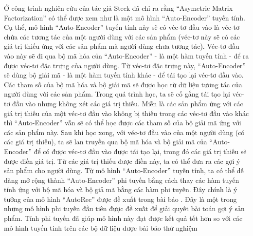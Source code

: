 Ở công trình nghiên cứu \cite{AMF} của tác giả Steck đã chỉ ra rằng “Asymetric Matrix Factorization” có thể được xem như là một mô hình “Auto-Encoder” tuyến tính. 
Cụ thể, mô hình ``Auto-Encoder'' tuyến tính này sẽ có véc-tơ đầu vào là véc-tơ chứa các tương tác của một người dùng với các sản phẩm (véc-tơ này sẽ có các giá trị thiếu ứng với các sản phẩm mà người dùng chưa tương tác). 
Véc-tơ đầu vào này sẽ đi qua bộ mã hóa của ``Auto-Encoder'' - là một hàm tuyến tính - để ra được véc-tơ đặc trưng của người dùng. 
Từ véc-tơ đặc trưng này, ``Auto-Encoder'' sẽ dùng bộ giải mã - là một hàm tuyến tính khác - để tái tạo lại véc-tơ đầu vào. 
Các tham số của bộ mã hóa và bộ giải mã sẽ được học từ dữ liệu tương tác của người dùng với các sản phẩm. 
Trong quá trình học, ta sẽ cố gắng tái tạo lại véc-tơ đầu vào nhưng không xét các giá trị thiếu. 
Miễn là các sản phẩm ứng với các giá trị thiếu của một véc-tơ đầu vào không bị thiếu trong các véc-tơ đầu vào khác thì ``Auto-Encoder'' vẫn sẽ có thể học được các tham số của bộ giải mã ứng với các sản phẩm này. 
Sau khi học xong, với véc-tơ đầu vào của một người dùng (có các giá trị thiếu), ta sẽ lan truyền qua bộ mã hóa và bộ giải mã của ``Auto-Encoder'' để có được véc-tơ đầu vào được tái tạo lại, trong đó các giá trị thiếu sẽ được điền giá trị. 
Từ các giá trị thiếu được điền này, ta có thể đưa ra các gợi ý sản phẩm cho người dùng. 
Từ mô hình ``Auto-Encoder'' tuyến tính, ta có thể dễ dàng mở rộng thành ``Auto-Encoder'' phi tuyến bằng cách thay các hàm tuyến tính ứng với bộ mã hóa và bộ giả mã bằng các hàm phi tuyến. 
Đây chính là ý tưởng của mô hình ``AutoRec'' được đề xuất trong bài báo \cite{autorec}. 
Đây là một trong những mô hình phi tuyến đầu tiên được đề xuất để giải quyết bài toán gợi ý sản phẩm. 
Tính phi tuyến đã giúp mô hình này đạt được kết quả tốt hơn so với các mô hình tuyến tính trên các bộ dữ liệu được bài báo thử nghiệm


